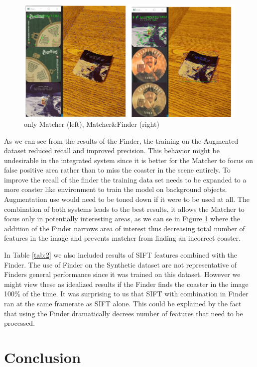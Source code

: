 \documentclass{article}
\begin{document}
\begin{figure}[H]
    \center
    \includegraphics[scale=0.4]{img/addedFinder.jpg}
    \caption{only Matcher (left), Matcher\&Finder (right)}
    \label{fig:2}
\end{figure}

As we can see from the results of the Finder, the training on the Augmented dataset reduced recall and improved precision.
This behavior might be undesirable in the integrated system since it is better for the Matcher to focus on false positive area rather than to miss the coaster in the scene entirely. To improve the recall of the finder the training data set needs to be expanded to a more coaster like environment to train the model on background objects. Augmentation use would need to be toned down if it were to be used at all.
The combination of both systems leads to the best results, it allows the Matcher to focus only in potentially interesting areas, as we can se in Figure \ref{fig:2} where the addition of the Finder narrows area of interest thus decreasing total number of features in the image and prevents matcher from finding an incorrect coaster.

In Table \ref{tab:2} we also included results of SIFT features combined with the Finder. The use of Finder on the Synthetic dataset are not representative of Finders general performance since it was trained on this dataset.
However we might view these as idealized results if the Finder finds the coaster in the image 100\% of the time.
It was surprising to us that SIFT with combination in Finder ran at the same framerate as SIFT alone.
This could be explained by the fact that using the Finder dramatically decrees number of features that need to be processed.



\section{Conclusion}
\end{document}
